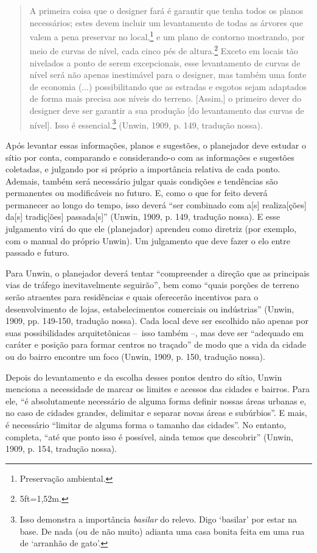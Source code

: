 \documentclass[12pt, a4paper]{book} %
\begin{document}
        \begin{quotation}
            A primeira coisa que o designer fará é garantir que tenha todos os planos necessários; estes devem incluir um levantamento de todas as árvores que valem a pena preservar no local,\footnote[31]{Preservação ambiental.} e um plano de contorno mostrando, por meio de curvas de nível, cada cinco pés de altura.\footnote[32]{5ft=1,52m.} Exceto em locais tão nivelados a ponto de serem excepcionais, esse levantamento de curvas de nível será não apenas inestimável para o designer, mas também uma fonte de economia (...) possibilitando que as estradas e esgotos sejam adaptados de forma mais precisa aos níveis do terreno. [Assim,] o primeiro dever do designer deve ser garantir a sua produção [do levantamento das curvas de nível]. Isso é essencial.\footnote[33]{Isso demonstra a importância \textit{basilar} do relevo. Digo `basilar' por estar na base. De nada (ou de não muito) adianta uma casa bonita feita em uma rua de `arranhão de gato'.} (Unwin, 1909, p. 149, tradução nossa).
        \end{quotation}

        Após levantar essas informações, planos e sugestões, o planejador deve estudar o sítio por conta, comparando e considerando-o com as informações e sugestões coletadas, e julgando por si próprio a importância relativa de cada ponto. Ademais, também será necessário julgar quais condições e tendências são permanentes ou modificáveis no futuro. E, como o que for feito deverá permanecer ao longo do tempo, isso deverá ``ser combinado com a[s] realiza[ções] da[s] tradiç[ões] passada[s]'' (Unwin, 1909, p. 149, tradução nossa). E esse julgamento virá do que ele (planejador) aprendeu como diretriz (por exemplo, com o manual do próprio Unwin). Um julgamento que deve fazer o elo entre passado e futuro.

        Para Unwin, o planejador deverá tentar ``compreender a direção que as principais vias de tráfego inevitavelmente seguirão'', bem como ``quais porções de terreno serão atraentes para residências e quais oferecerão incentivos para o desenvolvimento de lojas, estabelecimentos comerciais ou indústrias'' (Unwin, 1909, pp. 149-150, tradução nossa). Cada local deve ser escolhido não apenas por suas possibilidades arquitetônicas – isso também –, mas deve ser ``adequado em caráter e posição para formar centros no traçado'' de modo que a vida da cidade ou do bairro encontre um foco (Unwin, 1909, p. 150, tradução nossa).  

        Depois do levantamento e da escolha desses pontos dentro do sítio, Unwin menciona a necessidade de marcar os limites e acessos das cidades e bairros. Para ele, ``é absolutamente necessário de alguma forma definir nossas áreas urbanas e, no caso de cidades grandes, delimitar e separar novas áreas e subúrbios''. E mais, é necessário ``limitar de alguma forma o tamanho das cidades''. No entanto, completa, ``até que ponto isso é possível, ainda temos que descobrir'' (Unwin, 1909, p. 154, tradução nossa). 
\end{document}
